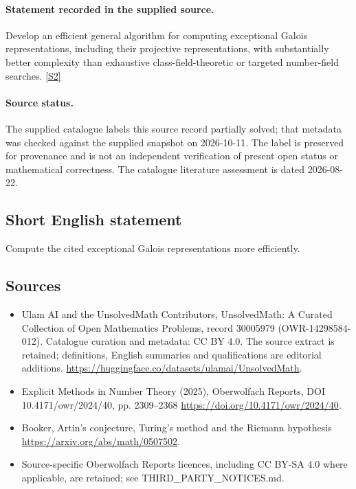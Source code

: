 \documentclass[11pt]{article}
\begin{document}
\paragraph{Statement recorded in the supplied source.}
Develop an efficient general algorithm for computing exceptional Galois representations, including their projective representations, with substantially better complexity than exhaustive class-field-theoretic or targeted number-field searches. \href{https://doi.org/10.4171/owr/2024/40}{[S2]}
\paragraph{Source status.}
The supplied catalogue labels this source record partially solved; that metadata was checked against the supplied snapshot on 2026-10-11. The label is preserved for provenance and is not an independent verification of present open status or mathematical correctness. The catalogue literature assessment is dated 2026-08-22.
\subsection{Short English statement}
Compute the cited exceptional Galois representations more efficiently.
\subsection{Sources}
\begin{itemize}
\item[S1] Ulam AI and the UnsolvedMath Contributors, UnsolvedMath: A Curated Collection of Open Mathematics Problems, record 30005979 (OWR-14298584-012). Catalogue curation and metadata: CC BY 4.0. The source extract is retained; definitions, English summaries and qualifications are editorial additions.
\url{https://huggingface.co/datasets/ulamai/UnsolvedMath}.
\item[S2] Explicit Methods in Number Theory (2025), Oberwolfach Reports, DOI 10.4171/owr/2024/40, pp. 2309--2368
\url{https://doi.org/10.4171/owr/2024/40}.
\item[S3] Booker, Artin's conjecture, Turing's method and the Riemann hypothesis
\url{https://arxiv.org/abs/math/0507502}.
\item Source-specific Oberwolfach Reports licences, including CC BY-SA 4.0 where applicable, are retained; see THIRD\_PARTY\_NOTICES.md.
\end{itemize}
\end{document}

